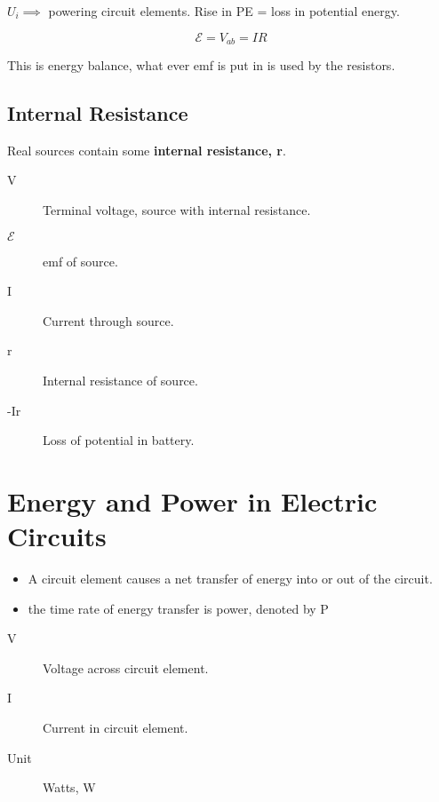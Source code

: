 $U_{i} \implies$ powering circuit elements. Rise in PE = loss in potential energy.

\[\mathcal{E} = V_{ab} = IR\]

This is energy balance, what ever emf is put in is used by the resistors.

\subsection{Internal Resistance}%
\label{sub:internal_resistance}

Real sources contain some \textbf{internal resistance, r}.


\begin{description}
	\item[V] Terminal voltage, source with internal resistance.
	\item[$\mathcal{E}$] emf of source.
	\item[I] Current through source.
	\item[r] Internal resistance of source.
	\item[-Ir] Loss of potential in battery.
\end{description}

\section{Energy and Power in Electric Circuits}%
\label{sec:energy_and_power_in_electric_circuits}

\begin{itemize}
	\item A circuit element causes a net transfer of energy into or out of the circuit.
		\item the time rate of energy transfer is power, denoted by P
\end{itemize}


\begin{description}
	\item[V] Voltage across circuit element.
		\item[I] Current in circuit element.
			\item[Unit] Watts, W
\end{description}


\newpage


